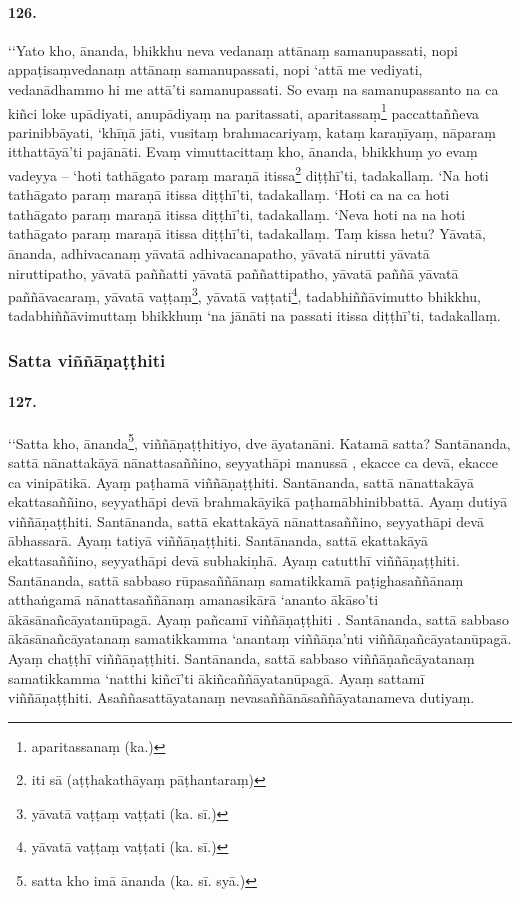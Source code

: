 \paragraph{126.} ‘‘Yato kho, ānanda, bhikkhu neva vedanaṃ attānaṃ samanupassati, nopi appaṭisaṃvedanaṃ attānaṃ samanupassati, nopi ‘attā me vediyati, vedanādhammo hi me attā’ti samanupassati. So evaṃ na samanupassanto na ca kiñci loke upādiyati, anupādiyaṃ na paritassati, aparitassaṃ\footnote{aparitassanaṃ (ka.)} paccattaññeva parinibbāyati, ‘khīṇā jāti, vusitaṃ brahmacariyaṃ, kataṃ karaṇīyaṃ, nāparaṃ itthattāyā’ti pajānāti. Evaṃ vimuttacittaṃ kho, ānanda, bhikkhuṃ yo evaṃ vadeyya – ‘hoti tathāgato paraṃ maraṇā itissa\footnote{iti sā (aṭṭhakathāyaṃ pāṭhantaraṃ)} diṭṭhī’ti, tadakallaṃ. ‘Na hoti tathāgato paraṃ maraṇā itissa diṭṭhī’ti, tadakallaṃ. ‘Hoti ca na ca hoti tathāgato paraṃ maraṇā itissa diṭṭhī’ti, tadakallaṃ. ‘Neva hoti na na hoti tathāgato paraṃ maraṇā itissa diṭṭhī’ti, tadakallaṃ. Taṃ kissa hetu? Yāvatā, ānanda, adhivacanaṃ yāvatā adhivacanapatho, yāvatā nirutti yāvatā niruttipatho, yāvatā paññatti yāvatā paññattipatho, yāvatā paññā yāvatā paññāvacaraṃ, yāvatā vaṭṭaṃ\footnote{yāvatā vaṭṭaṃ vaṭṭati (ka. sī.)}, yāvatā vaṭṭati\footnote{yāvatā vaṭṭaṃ vaṭṭati (ka. sī.)}, tadabhiññāvimutto bhikkhu, tadabhiññāvimuttaṃ bhikkhuṃ ‘na jānāti na passati itissa diṭṭhī’ti, tadakallaṃ.

\subsubsection{Satta viññāṇaṭṭhiti}

\paragraph{127.} ‘‘Satta kho, ānanda\footnote{satta kho imā ānanda (ka. sī. syā.)}, viññāṇaṭṭhitiyo, dve āyatanāni. Katamā satta? Santānanda, sattā nānattakāyā nānattasaññino, seyyathāpi manussā , ekacce ca devā, ekacce ca vinipātikā. Ayaṃ paṭhamā viññāṇaṭṭhiti. Santānanda, sattā nānattakāyā ekattasaññino, seyyathāpi devā brahmakāyikā paṭhamābhinibbattā. Ayaṃ dutiyā viññāṇaṭṭhiti. Santānanda, sattā ekattakāyā nānattasaññino, seyyathāpi devā ābhassarā. Ayaṃ tatiyā viññāṇaṭṭhiti. Santānanda, sattā ekattakāyā ekattasaññino, seyyathāpi devā subhakiṇhā. Ayaṃ catutthī viññāṇaṭṭhiti. Santānanda, sattā sabbaso rūpasaññānaṃ samatikkamā paṭighasaññānaṃ atthaṅgamā nānattasaññānaṃ amanasikārā ‘ananto ākāso’ti ākāsānañcāyatanūpagā. Ayaṃ pañcamī viññāṇaṭṭhiti . Santānanda, sattā sabbaso ākāsānañcāyatanaṃ samatikkamma ‘anantaṃ viññāṇa’nti viññāṇañcāyatanūpagā. Ayaṃ chaṭṭhī viññāṇaṭṭhiti. Santānanda, sattā sabbaso viññāṇañcāyatanaṃ samatikkamma ‘natthi kiñcī’ti ākiñcaññāyatanūpagā. Ayaṃ sattamī viññāṇaṭṭhiti. Asaññasattāyatanaṃ nevasaññānāsaññāyatanameva dutiyaṃ.

